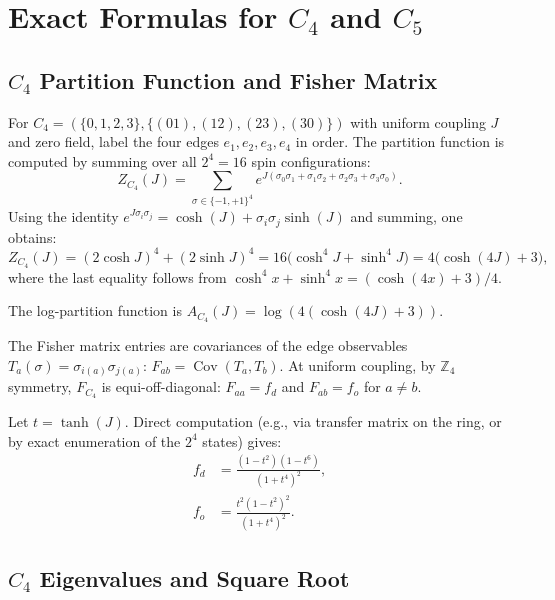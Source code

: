 \documentclass[11pt]{article}
\theoremstyle{definition}
\theoremstyle{remark}
\newcommand{\Fish}{F}
\newcommand{\partf}{Z}
\newcommand{\Cov}{\operatorname{Cov}}
\begin{document}
\appendix

\section{Exact Formulas for $C_4$ and $C_5$}
\label{app:exact}

\subsection{$C_4$ Partition Function and Fisher Matrix}

For $C_4 = (\{0,1,2,3\}, \{(01),(12),(23),(30)\})$ with uniform coupling
$J$ and zero field, label the four edges $e_1, e_2, e_3, e_4$ in order.
The partition function is computed by summing over all $2^4 = 16$ spin
configurations:
\begin{equation}
  \partf_{C_4}(J) = \sum_{\sigma \in \{-1,+1\}^4}
    e^{J(\sigma_0\sigma_1 + \sigma_1\sigma_2 + \sigma_2\sigma_3 + \sigma_3\sigma_0)}.
  \label{eq:z-c4-def}
\end{equation}
Using the identity $e^{J\sigma_i\sigma_j} = \cosh(J) + \sigma_i\sigma_j\sinh(J)$
and summing, one obtains:
\begin{equation}
  \partf_{C_4}(J) = (2\cosh J)^4 + (2\sinh J)^4
  = 16\bigl(\cosh^4 J + \sinh^4 J\bigr)
  = 4\bigl(\cosh(4J) + 3\bigr),
  \label{eq:z-c4}
\end{equation}
where the last equality follows from $\cosh^4 x + \sinh^4 x = (\cosh(4x)+3)/4$.

The log-partition function is $A_{C_4}(J) = \log(4(\cosh(4J)+3))$.

\medskip
The Fisher matrix entries are covariances of the edge observables
$T_a(\sigma)=\sigma_{i(a)}\sigma_{j(a)}$:
$F_{ab}=\Cov(T_a,T_b)$. At uniform coupling, by $\mathbb{Z}_4$ symmetry,
$\Fish_{C_4}$ is equi-off-diagonal:
$F_{aa}=f_d$ and $F_{ab}=f_o$ for $a\neq b$.

Let $t=\tanh(J)$. Direct computation (e.g., via transfer matrix on the ring,
or by exact enumeration of the $2^4$ states) gives:
\begin{align}
  f_d &= \frac{(1-t^2)(1-t^6)}{(1+t^4)^2}, \label{eq:fd-exact}\\
  f_o &= \frac{t^2(1-t^2)^2}{(1+t^4)^2}. \label{eq:fo-exact}
\end{align}

\subsection{$C_4$ Eigenvalues and Square Root}
\end{document}
